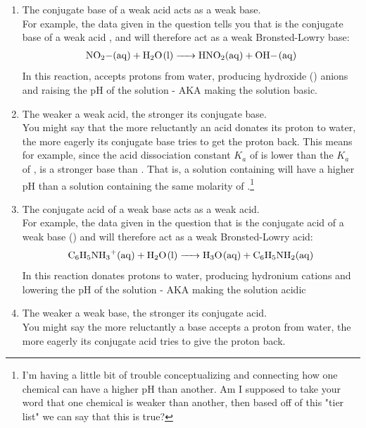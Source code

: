 \documentclass{article}  %
\begin{document}
\begin{enumerate}
    \item The conjugate base of a weak acid acts as a weak base. \\
    For example, the data given in the question tells you that  is the conjugate base of a weak acid , and will therefore act as a weak Bronsted-Lowry base: \\
    \begin{equation*}
        \begin{aligned}
            \ce{NO2-_(aq) + H2O_(l) -> HNO2_(aq) + OH-_(aq)}
        \end{aligned}
    \end{equation*}
    In this reaction,  accepts protons from water, producing hydroxide () anions and raising the pH of the solution - AKA making the solution basic.
    \item The weaker a weak acid, the stronger its conjugate base. \\
    You might say that the more reluctantly an acid donates its proton to water, the more eagerly its conjugate base tries to get the proton back. This means for example, since the acid dissociation constant $K_a$ of  is lower than the $K_a$ of ,  is a stronger base than . That is, a solution containing  will have a higher pH than a solution containing the same molarity of .\footnote{I'm having a little bit of trouble conceptualizing and connecting how one chemical can have a higher pH than another. Am I supposed to take your word that one chemical is weaker than another, then based off of this "tier list" we can say that this is true?}
    \item The conjugate acid of a weak base acts as a weak acid. \\
    For example, the data given in the question that  is the conjugate acid of a weak base () and will therefore act as a weak Bronsted-Lowry acid: \\
    \begin{equation*}
        \begin{aligned}
            \ce{C6H5NH3+_(aq) + H2O_(l) -> H3O_(aq) + C6H5NH2_(aq)}
        \end{aligned}
    \end{equation*}
    In this reaction  donates protons to water, producing hydronium cations and lowering the pH of the solution - AKA making the solution acidic %
    \item The weaker a weak base, the stronger its conjugate acid. \\
    You might say the more reluctantly a base accepts a proton from water, the more eagerly its conjugate acid tries to give the proton back.  %
    
\end{enumerate}
\end{document}
